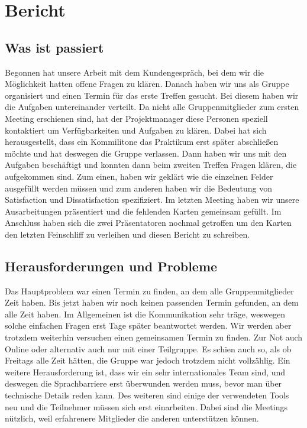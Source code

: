 \documentclass[a4paper, 12pt, oneside, BCOR1cm,toc=chapterentrywithdots]{scrbook}
\begin{document}
\chapter{Bericht}
\section*{Was ist passiert}

Begonnen hat unsere Arbeit mit dem Kundengespräch, bei dem wir die Möglichkeit hatten offene Fragen zu klären. Danach haben wir uns als Gruppe organisiert und einen Termin für das erste Treffen gesucht. Bei diesem haben wir die Aufgaben untereinander verteilt. 
Da nicht alle Gruppenmitglieder zum ersten Meeting erschienen sind, hat der Projektmanager diese Personen speziell kontaktiert um Verfügbarkeiten und Aufgaben zu klären. Dabei hat sich herausgestellt, dass ein Kommilitone das Praktikum erst später abschließen möchte und hat deswegen die Gruppe verlassen.
Dann haben wir uns mit den Aufgaben beschäftigt und konnten dann beim zweiten Treffen Fragen klären, die aufgekommen sind. Zum einen, haben wir geklärt wie die einzelnen Felder ausgefüllt werden müssen und zum anderen haben wir die Bedeutung von Satisfaction und Dissatisfaction spezifiziert. 
Im letzten Meeting haben wir unsere Ausarbeitungen präsentiert und die fehlenden Karten gemeinsam gefüllt. Im Anschluss haben sich die zwei Präsentatoren nochmal getroffen um den Karten den letzten Feinschliff zu verleihen und diesen Bericht zu schreiben.

\section*{Herausforderungen und Probleme}
Das Hauptproblem war einen Termin zu finden, an dem alle Gruppenmitglieder Zeit haben. Bis jetzt haben wir noch keinen passenden Termin gefunden, an dem alle Zeit haben.
Im Allgemeinen ist die Kommunikation sehr träge, weswegen solche einfachen Fragen erst Tage später beantwortet werden. Wir werden aber trotzdem weiterhin versuchen einen gemeinsamen Termin zu finden. Zur Not auch Online oder alternativ auch nur mit einer Teilgruppe.
Es schien auch so, als ob Freitags alle Zeit hätten, die Gruppe war jedoch trotzdem nicht vollzählig.
Ein weitere Herausforderung ist, dass wir ein sehr internationales Team sind, und deswegen die Sprachbarriere erst überwunden werden muss, bevor man über technische Details reden kann. 
Des weiteren sind einige der verwendeten Tools neu und die Teilnehmer müssen sich erst einarbeiten.  Dabei sind die Meetings nützlich, weil erfahrenere Mitglieder die anderen unterstützen können.
\end{document}
